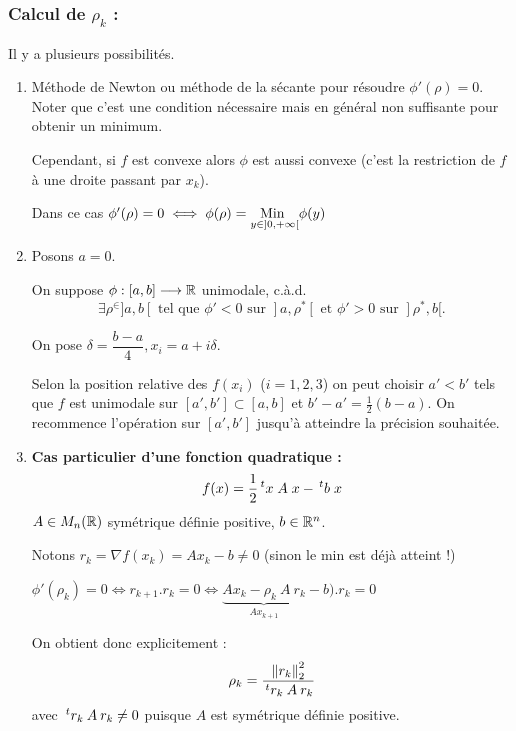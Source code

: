 \subsubsection*{Calcul de $\rho_k$ :}
Il y a plusieurs possibilités.
\begin{enumerate}[label=•]
    \item Méthode de Newton ou méthode de la sécante pour résoudre
        $\phi'(\rho) = 0$. Noter que c'est une condition nécessaire mais
        en général non suffisante pour obtenir un minimum.

        Cependant, si $f$ est convexe alors $\phi$ est aussi convexe (c'est
        la restriction de $f$ à une droite passant par $x_k$).

    Dans ce cas $\phi'(\rho) = 0 \iff \phi(\rho) = \underset{y \in ]0,+\infty[}{\text{Min }}{\phi(y)}$

    \item Posons $a = 0$.
        
        On suppose $\phi : [a,b] \longrightarrow \mathbb{R}$ unimodale, c.à.d. 
        \[
            \exists \rho^
        \in ]a,b[ \text{ tel que } \phi' < 0 \text{ sur } ]a,\rho^*[ \text{ et } \phi' > 0 
        \text{ sur } ]\rho^*, b[. 
        \]
        
        On pose $\delta = \dfrac{b-a}{4}, x_i = a + i\delta$.

        Selon la position relative des $f(x_i)$ ($i = 1,2,3$) on peut choisir
        $a' < b'$ tels que $f$ est unimodale sur $[a',b'] \subset [a,b]$ et
        $b' - a' = \frac{1}{2} (b - a)$. On recommence l'opération sur
        $[a',b']$ jusqu'à atteindre la précision souhaitée.


    \item \textbf{Cas particulier d'une fonction quadratique :}
        \[
            f(x) = \frac{1}{2} \,^tx \; A \; x - \,^tb \; x
        \]
    $A \in M_n(\mathbb{R})$ symétrique définie positive, $b \in \mathbb{R}^n$.

    Notons $r_k = \nabla f(x_k) = A x_k - b \neq 0$ (sinon le min
    est déjà atteint !)

    $\phi'(\rho_k) = 0 \iff r_{k+1} . r_k = 0 \iff \underbrace{A x_k - \rho_k \: A \: r_k }_{Ax_{k+1}} - b) . r_k = 0$

    On obtient donc explicitement : 
    \[
        \rho_k = \frac{\left\lVert r_k\right\rVert^2_2}{\,^tr_k \: A \: r_k}
    \]
    avec $\,^tr_k \: A \: r_k \neq 0$ puisque $A$ est symétrique définie
    positive.
\end{enumerate}

